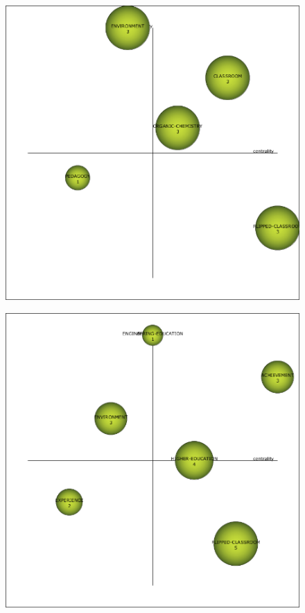 \documentclass{textolivre-html}
\begin{document}
\begin{figure}[htbp]
 \begin{minipage}{.45\textwidth}
 \includegraphics[width=\textwidth]{Fig04a.png}
 \label{fig04a}
 \end{minipage}
 \hfill
 \begin{minipage}{.45\textwidth}
 \includegraphics[width=\textwidth]{Fig04b.png}

\end{minipage}
\end{figure}
\end{document}
